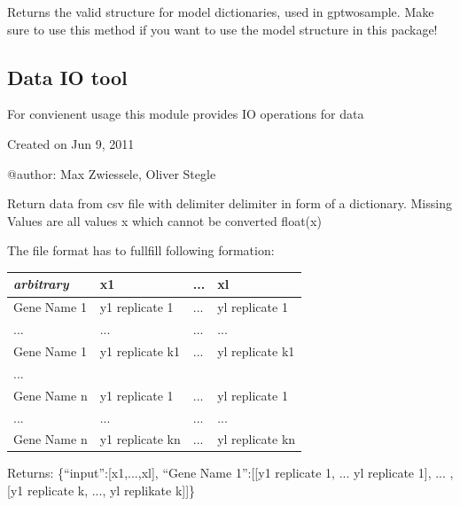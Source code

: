 \documentclass[letterpaper,10pt,english]{sphinxmanual}
\begin{document}
\begin{fulllineitems}
\label{data:gptwosample.data.data_base.has_model_structure}
Returns the valid structure for model dictionaries, used in gptwosample.
Make sure to use this method if you want to use the model structure in this package!

\end{fulllineitems}

\label{data:module-gptwosample.data.dataIO}

\subsection{Data IO tool}
\label{data:data-io-tool}
For convienent usage this module provides IO operations for data

Created on Jun 9, 2011

@author: Max Zwiessele, Oliver Stegle

\begin{fulllineitems}
\label{data:gptwosample.data.dataIO.get_data_from_csv}
Return data from csv file with delimiter delimiter in form of a dictionary.
Missing Values are all values x which cannot be converted float(x)

The file format has to fullfill following formation:

\begin{tabulary}{\linewidth}{|L|L|L|L|}
\hline
\textbf{
\emph{arbitrary}
} & \textbf{
x1
} & \textbf{
...
} & \textbf{
xl
}\\\hline

Gene Name 1
 & 
y1 replicate 1
 & 
...
 & 
yl replicate 1
\\\hline

...
 & 
...
 & 
...
 & 
...
\\\hline

Gene Name 1
 & 
y1 replicate k1
 & 
...
 & 
yl replicate k1
\\\hline

...
 &  &  & \\\hline

Gene Name n
 & 
y1 replicate 1
 & 
...
 & 
yl replicate 1
\\\hline

...
 & 
...
 & 
...
 & 
...
\\\hline

Gene Name n
 & 
y1 replicate kn
 & 
...
 & 
yl replicate kn
\\\hline
\end{tabulary}


Returns: \{``input'':{[}x1,...,xl{]}, ``Gene Name 1'':{[}{[}y1 replicate 1, ... yl replicate 1{]}, ... ,{[}y1 replicate k, ..., yl replikate k{]}{]}\}

\end{fulllineitems}
\end{document}

